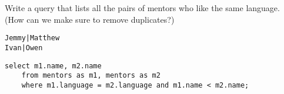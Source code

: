\begin{blocksection}
\question Write a query that lists all the pairs of mentors who like the same language. (How can we make sure to remove duplicates?)

\begin{lstlisting}
Jemmy|Matthew
Ivan|Owen
\end{lstlisting}

\begin{solution}
\begin{lstlisting}
select m1.name, m2.name
    from mentors as m1, mentors as m2
    where m1.language = m2.language and m1.name < m2.name;
\end{lstlisting}
\end{solution}
\end{blocksection}

